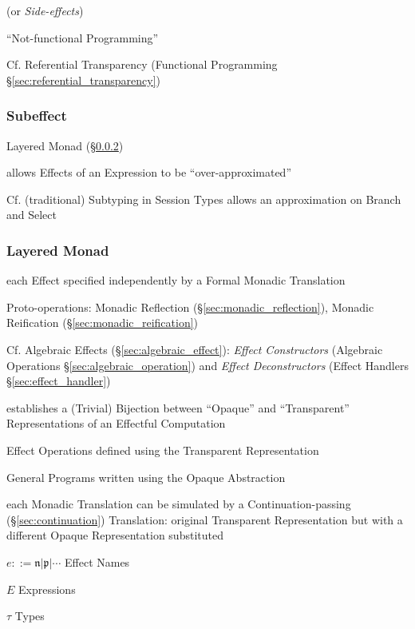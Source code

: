 (or \emph{Side-effects})

``Not-functional Programming''

\fist Cf. Referential Transparency
(Functional Programming \S\ref{sec:referential_transparency})



\subsubsection{Subeffect}\label{sec:subeffect}

Layered Monad (\S\ref{sec:layered_monad}) \cite{filinski99}

allows Effects of an Expression to be ``over-approximated''
\cite{orchard-yoshida16}

\fist Cf. (traditional) Subtyping in Session Types allows an
approximation on Branch and Select \cite{orchard-yoshida16}



\subsubsection{Layered Monad}\label{sec:layered_monad}
\cite{filinski99}

each Effect specified independently by a Formal Monadic Translation

Proto-operations: Monadic Reflection (\S\ref{sec:monadic_reflection}),
Monadic Reification (\S\ref{sec:monadic_reification})

\fist Cf. Algebraic Effects (\S\ref{sec:algebraic_effect}):
\emph{Effect Constructors} (Algebraic Operations
\S\ref{sec:algebraic_operation}) and \emph{Effect Deconstructors}
(Effect Handlers \S\ref{sec:effect_handler})


establishes a (Trivial) Bijection between ``Opaque'' and
``Transparent'' Representations of an Effectful Computation

Effect Operations defined using the Transparent Representation

General Programs written using the Opaque Abstraction

each Monadic Translation can be simulated by a Continuation-passing
(\S\ref{sec:continuation}) Translation: original Transparent
Representation but with a different Opaque Representation substituted

$e ::= \mathfrak{n} | \mathfrak{p} | \cdots$ Effect Names

$E$ Expressions

$\tau$ Types


